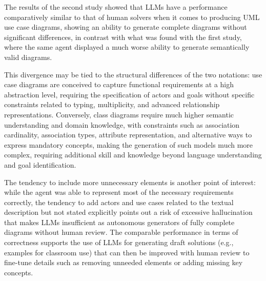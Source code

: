 The results of the second study showed that LLMs have a performance comparatively similar to that of human solvers when it comes to producing UML use case diagrams, showing an ability to generate complete diagrams without significant differences, in contrast with what was found with the first study, where the same agent displayed a much worse ability to generate semantically valid diagrams. 

This divergence may be tied to the structural differences of the two notations: use case diagrams are conceived to capture functional requirements at a high abstraction level, requiring the specification of actors and goals without specific constraints related to typing, multiplicity, and advanced relationship representations. Conversely, class diagrams require much higher semantic understanding and domain knowledge, with constraints such as association cardinality, association types, attribute representation, and alternative ways to express mandatory concepts, making the generation of such models much more complex, requiring additional skill and knowledge beyond language understanding and goal identification.

The tendency to include more unnecessary elements is another point of interest: while the agent was able to represent most of the necessary requirements correctly, the tendency to add actors and use cases related to the textual description but not stated explicitly points out a risk of excessive hallucination that makes LLMs insufficient as autonomous generators of fully complete diagrams without human review. The comparable performance in terms of correctness supports the use of LLMs for generating draft solutions (e.g., examples for classroom use) that can then be improved with human review to fine-tune details such as removing unneeded elements or adding missing key concepts.


